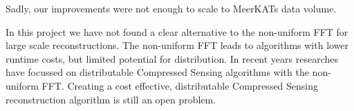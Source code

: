 Sadly, our improvements were not enough to scale to MeerKATs data volume. 

In this project we have not found a clear alternative to the non-uniform FFT for large scale reconstructions. The non-uniform FFT leads to algorithms with lower runtime costs, but limited potential for distribution. In recent years researches have focussed on distributable Compressed Sensing algorithms\cite{dabbech2018cygnus, pratley2018fast} with the non-uniform FFT. Creating a cost effective, distributable Compressed Sensing reconstruction algorithm is still an open problem. 







